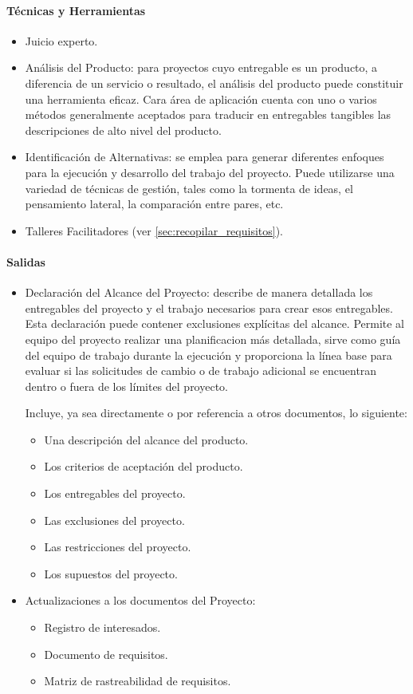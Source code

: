 \documentclass[a4paper,twosides]{article}
\newlength{\wideitemsep}
\let\olditem\item
\renewcommand{\item}{\setlength{\itemsep}{\wideitemsep}\olditem}
\begin{document}
\paragraph{Técnicas y Herramientas}
\begin{itemize}
\item Juicio experto.
\item Análisis del Producto: para proyectos cuyo entregable es un producto, a diferencia de un servicio o resultado, el análisis del producto puede constituir una herramienta eficaz. Cara área de aplicación cuenta con uno o varios métodos generalmente aceptados para traducir en entregables tangibles las descripciones de alto nivel del producto.
\item Identificación de Alternativas: se emplea para generar diferentes enfoques para la ejecución y desarrollo del trabajo del proyecto. Puede utilizarse una variedad de técnicas de gestión, tales como la tormenta de ideas, el pensamiento lateral, la comparación entre pares, etc.
\item Talleres Facilitadores (ver \ref{sec:recopilar_requisitos}).
\end{itemize}
\paragraph{Salidas}
\begin{itemize}
\item Declaración del Alcance del Proyecto: describe de manera detallada los entregables del proyecto y el trabajo necesarios para crear esos entregables. Esta declaración puede contener exclusiones explícitas del alcance. Permite al equipo del proyecto realizar una planificacion más detallada, sirve como guía del equipo de trabajo durante la ejecución y proporciona la línea base para evaluar si las solicitudes de cambio o de trabajo adicional se encuentran dentro o fuera de los límites del proyecto.
\par Incluye, ya sea directamente o por referencia a otros documentos, lo siguiente:
\begin{itemize}
\item Una descripción del alcance del producto.
\item Los criterios de aceptación del producto.
\item Los entregables del proyecto.
\item Las exclusiones del proyecto.
\item Las restricciones del proyecto.
\item Los supuestos del proyecto.
\end{itemize}
\item Actualizaciones a los documentos del Proyecto:
\begin{itemize}
\item Registro de interesados.
\item Documento de requisitos.
\item Matriz de rastreabilidad de requisitos.
\end{itemize}
\end{itemize}
\end{document}
